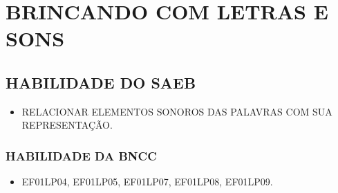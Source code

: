
\chapter{BRINCANDO COM LETRAS E SONS}

\section*{HABILIDADE DO SAEB}

\begin{itemize}
\item \uppercase{Relacionar elementos sonoros das palavras com sua representação.}
\end{itemize}

\subsection{HABILIDADE DA BNCC}

\begin{itemize}
\item EF01LP04, EF01LP05, EF01LP07, EF01LP08, EF01LP09.
\end{itemize}



